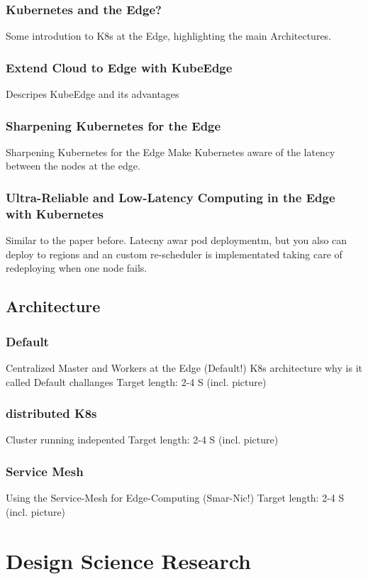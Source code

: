 \documentclass[MSC,Master,english]{twbook}%
\begin{document}
\subsection{Kubernetes and the Edge?}
Some introdution to K8s at the Edge, highlighting the main Architectures.
\subsection{Extend Cloud to Edge with KubeEdge}
Descripes KubeEdge and its advantages
\subsection{Sharpening Kubernetes for the Edge}
Sharpening Kubernetes for the Edge
Make Kubernetes aware of the latency between the nodes at the edge.
\subsection{Ultra-Reliable and Low-Latency Computing in the Edge with Kubernetes}
Similar to the paper before. Latecny awar pod deploymentm, but you also can deploy to regions and an custom re-scheduler is implementated taking care of redeploying when one node fails.

\section{Architecture}
\label{sec:architecture}
\subsection{Default}
Centralized Master and Workers at the Edge (Default!) K8s architecture
why is it called Default
challanges
Target length: 2-4 S (incl. picture)
\subsection{distributed K8s}
Cluster running indepented
Target length: 2-4 S (incl. picture)
\subsection{Service Mesh}
Using the Service-Mesh for Edge-Computing (Smar-Nic!)
Target length: 2-4 S (incl. picture)



\chapter{Design Science Research}
\label{chap:dsr}
\end{document}
